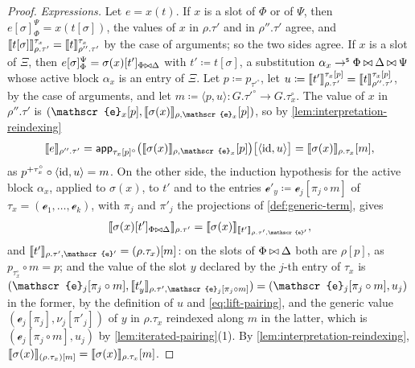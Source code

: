 \begin{proof}
    \emph{Expressions.} Let $e = x(t)$. If $x$ is a slot of $\Phi$ or of $\Psi$, then $e[\sigma]_\Phi^\Psi = x(t[\sigma])$, the values of $x$ in $\rho.\tau'$ and in $\rho''.\tau'$ agree, and $\llbracket t[\sigma]\rrbracket^{\tau_x}_{\rho.\tau'} = \llbracket t\rrbracket^{\tau_x}_{\rho''.\tau'}$ by the case of arguments; so the two sides agree. If $x$ is a slot of $\Xi$, then $e[\sigma]_\Phi^\Psi = \sigma(x)[t']_{\Phi \mathbin{\bowtie} \Delta}$ with $t' \coloneqq t[\sigma]$, a substitution $\alpha_x \to^{\mathsf{s}} \Phi \mathbin{\bowtie} \Delta \mathbin{\bowtie} \Psi$ whose active block $\alpha_x$ is an entry of $\Xi$. Let $p \coloneqq p_{\tau'^{\circ}}$, let $u \coloneqq \llbracket t'\rrbracket^{\tau_x[p]}_{\rho.\tau'} = \llbracket t\rrbracket^{\tau_x[p]}_{\rho''.\tau'}$, by the case of arguments, and let $m \coloneqq \langle p, u \rangle : G.\tau'^{\circ} \to G.\tau_x^{\circ}$. The value of $x$ in $\rho''.\tau'$ is $(\mathscr{e}_x[p], \sem{\sigma(x)}_{\rho, \mathscr{e}_x}[p])$, so by \cref{lem:interpretation-reindexing}
    \[
        \sem{e}_{\rho''.\tau'} = \app_{\tau_x[p]^{\circ}}\big(\sem{\sigma(x)}_{\rho, \mathscr{e}_x}[p]\big)\big[\langle \id, u \rangle\big] = \sem{\sigma(x)}_{\rho.\tau_x}[m],
    \]
    as $p^{+\tau_x^{\circ}} \circ \langle \mathrm{id}, u \rangle = m$.
    On the other side, the induction hypothesis for the active block $\alpha_x$, applied to $\sigma(x)$, to $t'$ and to the entries $\mathscr{e}'_y \coloneqq \mathscr{e}_j[\pi_j \circ m]$ of $\tau_x = (\mathscr{e}_1, \ldots, \mathscr{e}_k)$, with $\pi_j$ and $\pi'_j$ the projections of \cref{def:generic-term}, gives
    \[
        \sem{\sigma(x)[t']_{\Phi \concat \Delta}}_{\rho.\tau'} = \sem{\sigma(x)}_{\sem{t'}_{\rho.\tau', \mathscr{e}'}},
    \]
    and $\sem{t'}_{\rho.\tau', \mathscr{e}'} = (\rho.\tau_x)[m]$: on the slots of $\Phi \mathbin{\bowtie} \Delta$ both are $\rho[p]$, as $p_{\tau_x^{\circ}} \circ m = p$; and the value of the slot $y$ declared by the $j$-th entry of $\tau_x$ is $(\mathscr{e}_j[\pi_j \circ m], \sem{t'_y}_{\rho.\tau', \mathscr{e}_j[\pi_j \circ m]}) = (\mathscr{e}_j[\pi_j \circ m], u_j)$ in the former, by the definition of $u$ and \eqref{eq:lift-pairing}, and the generic value $(\mathscr{e}_j[\pi_j], \nu_j[\pi'_j])$ of $y$ in $\rho.\tau_x$ reindexed along $m$ in the latter, which is $(\mathscr{e}_j[\pi_j \circ m], u_j)$ by \cref{lem:iterated-pairing}(1). By \cref{lem:interpretation-reindexing}, $\llbracket\sigma(x)\rrbracket_{(\rho.\tau_x)[m]} = \llbracket\sigma(x)\rrbracket_{\rho.\tau_x}[m]$.
\end{proof}

